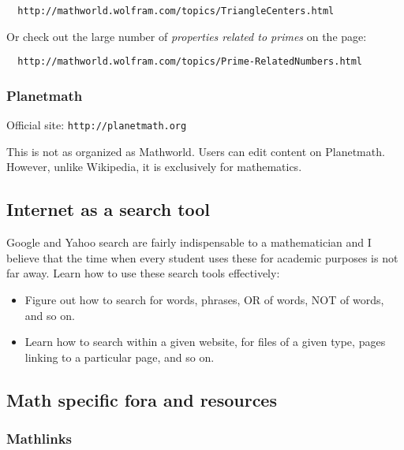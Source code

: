 \documentclass[a4paper]{amsart}
\begin{document}
\begin{verbatim}
  http://mathworld.wolfram.com/topics/TriangleCenters.html
\end{verbatim}

Or check out the large number of {\em properties related to primes} on the page:

\begin{verbatim}
  http://mathworld.wolfram.com/topics/Prime-RelatedNumbers.html
\end{verbatim}
\subsubsection{Planetmath}

Official site: {\tt http://planetmath.org}

This is not as organized as Mathworld. Users can edit content on Planetmath. However, unlike Wikipedia, it is exclusively for
mathematics.

\subsection{Internet as a search tool}

Google and Yahoo search are fairly indispensable to a mathematician and I believe that the time when every student uses these
for academic purposes is not far away. Learn how to use these search tools effectively:

\begin{itemize}

\item Figure out how to search for words, phrases, OR of words, NOT of words, and so on.

\item Learn how to search within a given website, for files of a given type, pages linking to a particular page, and so on.

\end{itemize}


\subsection{Math specific fora and resources}

\subsubsection{Mathlinks}
\end{document}
